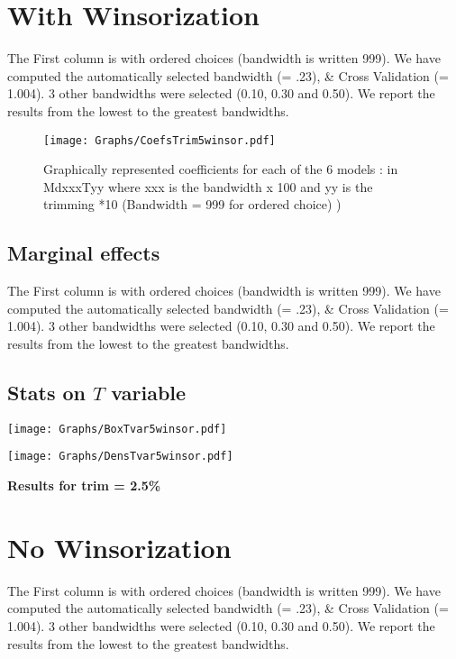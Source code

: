 \documentclass[a4paper]{article}
\begin{document}
\section{With Winsorization}
The First column is with ordered choices (bandwidth is written 999). We  have computed the  automatically selected bandwidth  (= .23), \& Cross Validation (= 1.004). 3 other  bandwidths were selected (0.10, 0.30 and 0.50). We report the results from the lowest to the greatest bandwidths. \\



\newpage

\begin{sidewaysfigure}[h!]
\caption{Graphically represented coefficients for each of the 6 models : in MdxxxTyy  where xxx is the bandwidth x 100 and yy is the trimming *10 (Bandwidth = 999 for ordered choice) )}\label{PlotFOK}
\texttt{[image: Graphs/CoefsTrim5winsor.pdf]}

\end{sidewaysfigure}
\clearpage

\subsection{Marginal effects}

The First column is with ordered choices (bandwidth is written 999). We  have computed the  automatically selected bandwidth  (= .23), \& Cross Validation (= 1.004). 3 other  bandwidths were selected (0.10, 0.30 and 0.50). We report the results from the lowest to the greatest bandwidths. \\
\newpage
\subsection{Stats on $T$ variable}



\texttt{[image: Graphs/BoxTvar5winsor.pdf]}


\texttt{[image: Graphs/DensTvar5winsor.pdf]}


\newpage

\begin{center}
\Large{\textbf{Results for trim = 2.5\% }}
\end{center}

\section{No Winsorization}
The First column is with ordered choices (bandwidth is written 999). We  have computed the  automatically selected bandwidth  (= .23), \& Cross Validation (= 1.004). 3 other  bandwidths were selected (0.10, 0.30 and 0.50). We report the results from the lowest to the greatest bandwidths. \\
\end{document}
